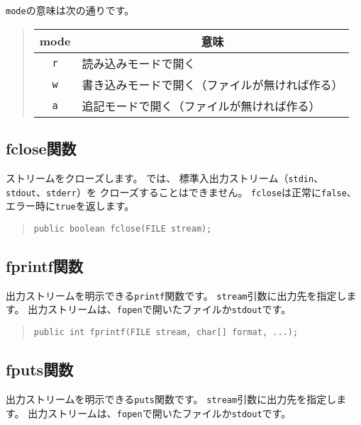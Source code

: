 \verb/mode/の意味は次の通りです。

\begin{quote}
\begin{tabular}{c|l}
\multicolumn{1}{c|}{mode} & \multicolumn{1}{c}{意味} \\\hline
\verb/r/ & 読み込みモードで開く \\
\verb/w/ & 書き込みモードで開く（ファイルが無ければ作る） \\
\verb/a/ & 追記モードで開く（ファイルが無ければ作る）
\end{tabular}
\end{quote}

\subsection{fclose関数}

ストリームをクローズします。
\tacos では、
標準入出力ストリーム（\verb/stdin/、\verb/stdout/、\verb/stderr/）を
クローズすることはできません。
\verb/fclose/は正常に\verb/false/、
エラー時に\verb/true/を返します。

\begin{quote}
\begin{verbatim}
public boolean fclose(FILE stream);
\end{verbatim}
\end{quote}

\subsection{fprintf関数}

出力ストリームを明示できる\verb/printf/関数です。
\verb/stream/引数に出力先を指定します。
出力ストリームは、\verb/fopen/で開いたファイルか\verb/stdout/です。

\begin{quote}
\begin{verbatim}
public int fprintf(FILE stream, char[] format, ...);
\end{verbatim}
\end{quote}

\subsection{fputs関数}

出力ストリームを明示できる\verb/puts/関数です。
\verb/stream/引数に出力先を指定します。
出力ストリームは、\verb/fopen/で開いたファイルか\verb/stdout/です。

